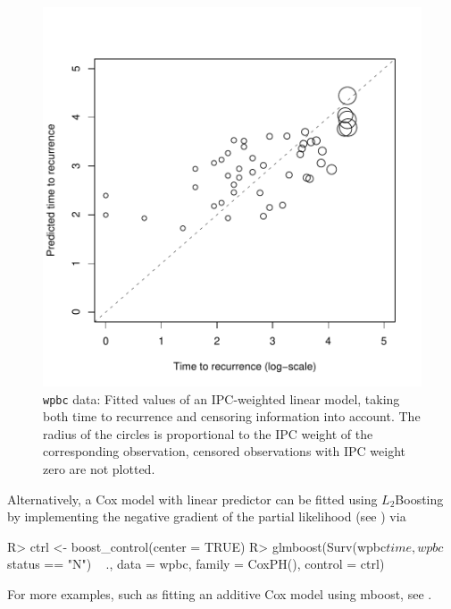 \documentclass{article}
\newcommand{\Rpackage}[1]{{\normalfont\fontseries{b}\selectfont #1}}
\newcommand{\Robject}[1]{\texttt{#1}}
\newenvironment{Schunk}{}{}
\begin{document}
\begin{figure}[t]
\begin{center}
\includegraphics{figures/BH-wpbc-glmboost-censored-fit}
\caption{\Robject{wpbc} data: Fitted values of an IPC-weighted linear
  model, taking both time to recurrence and 
    censoring information into account. The radius of the circles is proportional to the
    IPC weight of the corresponding observation, censored observations with IPC weight zero
    are not plotted. \label{wpbc-glmboost-censored-fit}}
\end{center}
\end{figure}

Alternatively, a Cox model with linear predictor can be fitted using
$L_2$Boosting by 
implementing the negative gradient  
of the partial likelihood (see \cite{ridgew99}) via
\begin{Schunk}
\begin{Sinput}
R> ctrl <- boost_control(center = TRUE)
R> glmboost(Surv(wpbc$time, wpbc$status == "N") ~ 
         ., data = wpbc, family = CoxPH(), control = ctrl)
\end{Sinput}
\end{Schunk}
For more examples, such as fitting an additive Cox model using
\Rpackage{mboost}, see \citep{Hothorn:2006:Bioinformatics:16940323}.  

\clearpage



\end{document}
